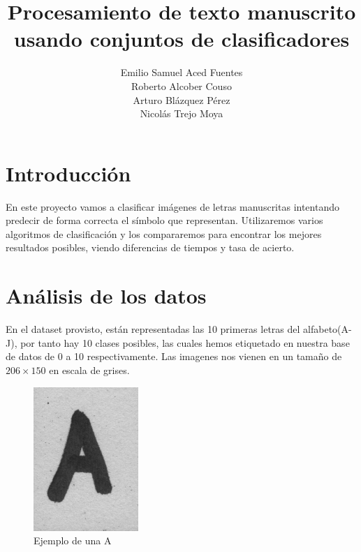 \documentclass[8pt,a4paper]{article}
\begin{document}
\title{Procesamiento de texto manuscrito usando conjuntos de clasificadores}

\author{
Emilio Samuel Aced Fuentes \\
Roberto Alcober Couso \\
Arturo Bl\'azquez P\'erez \\
Nicol\'as Trejo Moya \\
}

\maketitle

\section{Introducci\'on}
En este proyecto vamos a clasificar im\'agenes de letras manuscritas intentando predecir de forma correcta el s\'imbolo que representan.
Utilizaremos varios algoritmos de clasificaci\'on y los compararemos para encontrar los mejores resultados posibles, viendo diferencias de tiempos y  tasa de acierto.


\section{An\'alisis de los datos}
En el dataset provisto, est\'an representadas las 10 primeras letras del alfabeto(A-J), por tanto hay 10 clases posibles, las cuales hemos etiquetado en nuestra base de datos de 0 a 10 respectivamente.
Las imagenes nos vienen en un tamaño de $206\times150$ en escala de grises.


\begin{figure}[htbp]
	\centering
    \includegraphics[scale=0.5]{./sin_procesar/l00000_A.png}
    \caption{Ejemplo de una A}
\end{figure}
\end{document}
